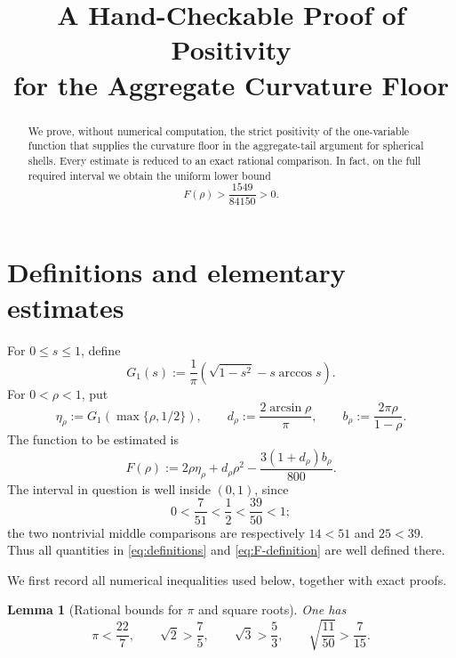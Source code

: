 \documentclass[11pt]{article}
\title{A Hand-Checkable Proof of Positivity\\
for the Aggregate Curvature Floor}
\author{}
\date{}
\newtheorem{lemma}{Lemma}
\begin{document}
\maketitle

\begin{abstract}
We prove, without numerical computation, the strict positivity of the
one-variable function that supplies the curvature floor in the aggregate-tail
argument for spherical shells. Every estimate is reduced to an exact
rational comparison. In fact, on the full required interval we obtain the
uniform lower bound
\[
 F(\rho)>\frac{1549}{84150}>0.
\]
\end{abstract}

\section{Definitions and elementary estimates}

For \(0\leq s\leq1\), define
\begin{equation}
 G_1(s):=\frac{1}{\pi}
 \left(\sqrt{1-s^2}-s\arccos s\right).
 \label{eq:G1-definition}
\end{equation}
For \(0<\rho<1\), put
\begin{equation}
 \eta_\rho:=G_1\!\left(\max\{\rho,1/2\}\right),
 \qquad
 d_\rho:=\frac{2\arcsin\rho}{\pi},
 \qquad
 b_\rho:=\frac{2\pi\rho}{1-\rho}.
 \label{eq:definitions}
\end{equation}
The function to be estimated is
\begin{equation}
 F(\rho):=2\rho\eta_\rho+d_\rho\rho^2
 -\frac{3(1+d_\rho)b_\rho}{800}.
 \label{eq:F-definition}
\end{equation}
The interval in question is well inside \((0,1)\), since
\[
 0<\frac7{51}<\frac12<\frac{39}{50}<1;
\]
the two nontrivial middle comparisons are respectively \(14<51\) and
\(25<39\). Thus all quantities in \eqref{eq:definitions} and
\eqref{eq:F-definition} are well defined there.

We first record all numerical inequalities used below, together with exact
proofs.

\begin{lemma}[Rational bounds for \(\pi\) and square roots]
\label{lem:rational-bounds}
One has
\begin{equation}
 \pi<\frac{22}{7},\qquad
 \sqrt2>\frac75,\qquad
 \sqrt3>\frac53,\qquad
 \sqrt{\frac{11}{50}}>\frac7{15}.
 \label{eq:rational-bounds}
\end{equation}
\end{lemma}
\end{document}
